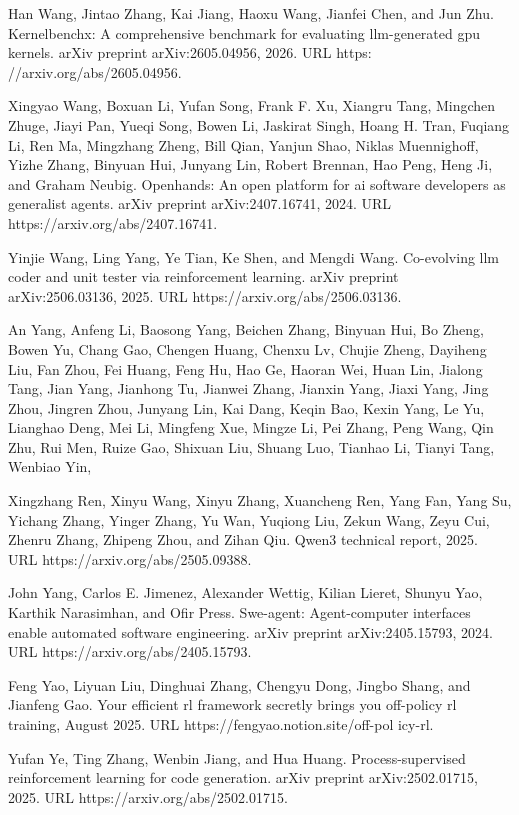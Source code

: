 \documentclass[
  10
]{article}
\begin{document}
Han Wang, Jintao Zhang, Kai Jiang, Haoxu Wang, Jianfei Chen, and Jun
Zhu. Kernelbenchx: A comprehensive benchmark for evaluating
llm-generated gpu kernels. arXiv preprint arXiv:2605.04956, 2026. URL
https: //arxiv.org/abs/2605.04956.

Xingyao Wang, Boxuan Li, Yufan Song, Frank F. Xu, Xiangru Tang, Mingchen
Zhuge, Jiayi Pan, Yueqi Song, Bowen Li, Jaskirat Singh, Hoang H. Tran,
Fuqiang Li, Ren Ma, Mingzhang Zheng, Bill Qian, Yanjun Shao, Niklas
Muennighoff, Yizhe Zhang, Binyuan Hui, Junyang Lin, Robert Brennan, Hao
Peng, Heng Ji, and Graham Neubig. Openhands: An open platform for ai
software developers as generalist agents. arXiv preprint
arXiv:2407.16741, 2024. URL https://arxiv.org/abs/2407.16741.

Yinjie Wang, Ling Yang, Ye Tian, Ke Shen, and Mengdi Wang. Co-evolving
llm coder and unit tester via reinforcement learning. arXiv preprint
arXiv:2506.03136, 2025. URL https://arxiv.org/abs/2506.03136.

An Yang, Anfeng Li, Baosong Yang, Beichen Zhang, Binyuan Hui, Bo Zheng,
Bowen Yu, Chang Gao, Chengen Huang, Chenxu Lv, Chujie Zheng, Dayiheng
Liu, Fan Zhou, Fei Huang, Feng Hu, Hao Ge, Haoran Wei, Huan Lin, Jialong
Tang, Jian Yang, Jianhong Tu, Jianwei Zhang, Jianxin Yang, Jiaxi Yang,
Jing Zhou, Jingren Zhou, Junyang Lin, Kai Dang, Keqin Bao, Kexin Yang,
Le Yu, Lianghao Deng, Mei Li, Mingfeng Xue, Mingze Li, Pei Zhang, Peng
Wang, Qin Zhu, Rui Men, Ruize Gao, Shixuan Liu, Shuang Luo, Tianhao Li,
Tianyi Tang, Wenbiao Yin,

Xingzhang Ren, Xinyu Wang, Xinyu Zhang, Xuancheng Ren, Yang Fan, Yang
Su, Yichang Zhang, Yinger Zhang, Yu Wan, Yuqiong Liu, Zekun Wang, Zeyu
Cui, Zhenru Zhang, Zhipeng Zhou, and Zihan Qiu. Qwen3 technical report,
2025. URL https://arxiv.org/abs/2505.09388.

John Yang, Carlos E. Jimenez, Alexander Wettig, Kilian Lieret, Shunyu
Yao, Karthik Narasimhan, and Ofir Press. Swe-agent: Agent-computer
interfaces enable automated software engineering. arXiv preprint
arXiv:2405.15793, 2024. URL https://arxiv.org/abs/2405.15793.

Feng Yao, Liyuan Liu, Dinghuai Zhang, Chengyu Dong, Jingbo Shang, and
Jianfeng Gao. Your efficient rl framework secretly brings you off-policy
rl training, August 2025. URL https://fengyao.notion.site/off-pol
icy-rl.

Yufan Ye, Ting Zhang, Wenbin Jiang, and Hua Huang. Process-supervised
reinforcement learning for code generation. arXiv preprint
arXiv:2502.01715, 2025. URL https://arxiv.org/abs/2502.01715.
\end{document}

